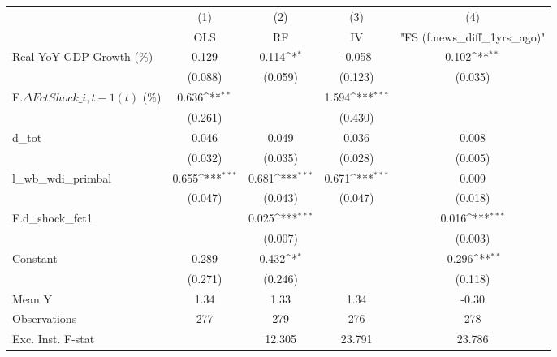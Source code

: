 {
\def\sym#1{\ifmmode^{#1}\else\(^{#1}\)\fi}
\begin{tabular}{l*{4}{c}}
\toprule
                    &\multicolumn{1}{c}{(1)}&\multicolumn{1}{c}{(2)}&\multicolumn{1}{c}{(3)}&\multicolumn{1}{c}{(4)}\\
                    &\multicolumn{1}{c}{OLS}&\multicolumn{1}{c}{RF}&\multicolumn{1}{c}{IV}&\multicolumn{1}{c}{ "FS (f.news\_diff\_1yrs\_ago)" }\\
\midrule
Real YoY GDP Growth (\%)&       0.129         &       0.114\sym{*}  &      -0.058         &       0.102\sym{**} \\
                    &     (0.088)         &     (0.059)         &     (0.123)         &     (0.035)         \\
\addlinespace
F.$\Delta FctShock\_{i,t-1}(t)$ (\%)&       0.636\sym{**} &                     &       1.594\sym{***}&                     \\
                    &     (0.261)         &                     &     (0.430)         &                     \\
\addlinespace
d\_tot               &       0.046         &       0.049         &       0.036         &       0.008         \\
                    &     (0.032)         &     (0.035)         &     (0.028)         &     (0.005)         \\
\addlinespace
l\_wb\_wdi\_primbal    &       0.655\sym{***}&       0.681\sym{***}&       0.671\sym{***}&       0.009         \\
                    &     (0.047)         &     (0.043)         &     (0.047)         &     (0.018)         \\
\addlinespace
F.d\_shock\_fct1      &                     &       0.025\sym{***}&                     &       0.016\sym{***}\\
                    &                     &     (0.007)         &                     &     (0.003)         \\
\addlinespace
Constant            &       0.289         &       0.432\sym{*}  &                     &      -0.296\sym{**} \\
                    &     (0.271)         &     (0.246)         &                     &     (0.118)         \\
\midrule
Mean Y              &        1.34         &        1.33         &        1.34         &       -0.30         \\
Observations        &         277         &         279         &         276         &         278         \\
Exc. Inst. F-stat   &                     &      12.305         &      23.791         &      23.786         \\
\bottomrule
\end{tabular}
}
